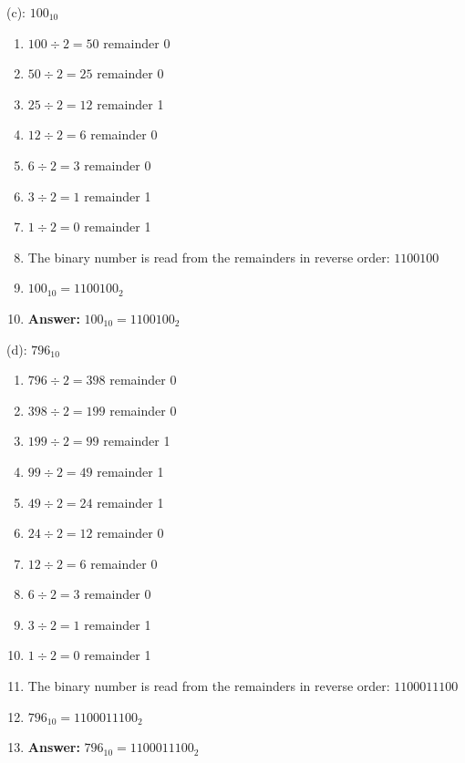 \documentclass{article}
\begin{document}
\vspace*{0.5cm}

\noindent (c): $100_{10}$

\begin{enumerate}
    \item $100 \div 2 = 50$ remainder 0
    \item $50 \div 2 = 25$ remainder 0
    \item $25 \div 2 = 12$ remainder 1
    \item $12 \div 2 = 6$ remainder 0
    \item $6 \div 2 = 3$ remainder 0
    \item $3 \div 2 = 1$ remainder 1
    \item $1 \div 2 = 0$ remainder 1
    \item The binary number is read from the remainders in reverse order: $1100100$
    \item $100_{10} = 1100100_2$
    \item \textbf{Answer:} $100_{10} = 1100100_2$
\end{enumerate}

\vspace*{0.5cm}

\noindent (d): $796_{10}$

\begin{enumerate}
    \item $796 \div 2 = 398$ remainder 0
    \item $398 \div 2 = 199$ remainder 0
    \item $199 \div 2 = 99$ remainder 1
    \item $99 \div 2 = 49$ remainder 1
    \item $49 \div 2 = 24$ remainder 1
    \item $24 \div 2 = 12$ remainder 0
    \item $12 \div 2 = 6$ remainder 0
    \item $6 \div 2 = 3$ remainder 0
    \item $3 \div 2 = 1$ remainder 1
    \item $1 \div 2 = 0$ remainder 1
    \item The binary number is read from the remainders in reverse order: $1100011100$
    \item $796_{10} = 1100011100_2$
    \item \textbf{Answer:} $796_{10} = 1100011100_2$
\end{enumerate}

\vspace*{0.5cm}
\end{document}
